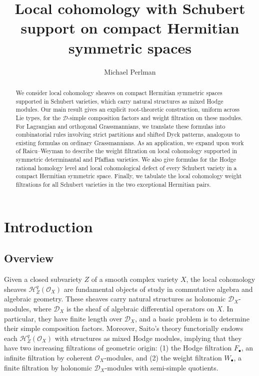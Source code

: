 \documentclass[12pt]{amsart}
\author{Michael Perlman}
\title[Local cohomology on Hermitian symmetric spaces]{Local cohomology with Schubert support on compact Hermitian symmetric spaces}
\theoremstyle{definition}
\numberwithin{equation}{section}
\begin{document}
\begin{abstract}
We consider local cohomology sheaves on compact Hermitian symmetric spaces supported in Schubert varieties, which carry natural structures as mixed Hodge modules. Our main result gives an explicit root-theoretic construction, uniform across Lie types, for the $\mathscr{D}$-simple composition factors and weight filtration on these modules. For Lagrangian and orthogonal Grassmannians, we translate these formulas into combinatorial rules involving strict partitions and shifted Dyck patterns, analogous to existing formulas on ordinary Grassmannians. As an application, we expand upon work of Raicu--Weyman to describe the weight filtration on local cohomology supported in symmetric determinantal and Pfaffian varieties. We also give formulas for the Hodge rational homology level and local cohomological defect of every Schubert variety in a compact Hermitian symmetric space. Finally, we tabulate the local cohomology weight filtrations for all Schubert varieties in the two exceptional Hermitian pairs.
\end{abstract}

\maketitle

\section{Introduction}

\subsection{Overview} Given a closed subvariety $Z$ of a smooth complex variety $X$,
the local cohomology sheaves $\mathscr H^q_Z(\mathscr O_X)$ are fundamental objects of study in commutative algebra and algebraic geometry. These sheaves carry natural structures as holonomic $\mathscr D_X$-modules, where $\mathscr D_X$ is the
sheaf of algebraic differential operators on $X$. In particular, they have finite length over $\mathscr D_X$, and a basic problem
is to determine their simple composition factors. Moreover, Saito's theory \cite{saito90} functorially endows each $\mathscr H^q_Z(\mathscr O_X)$ with structures as mixed Hodge modules, implying that they have two increasing filtrations of geometric origin: (1) the Hodge filtration $F_{\bullet}$, an infinite filtration by coherent $\mathscr{O}_X$-modules, and (2) the weight filtration $W_{\bullet}$, a finite filtration by holonomic $\mathscr{D}_X$-modules with semi-simple quotients. 
\end{document}
